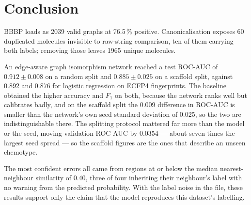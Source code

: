 \section{Conclusion}

BBBP loads as 2039 valid graphs at 76.5\,\% positive. Canonicalisation exposes 60 duplicated molecules invisible to raw-string comparison, ten of them carrying both labels; removing those leaves 1965 unique molecules.

An edge-aware graph isomorphism network reached a test ROC-AUC of $0.912 \pm 0.008$ on a random split and $0.885 \pm 0.025$ on a scaffold split, against 0.892 and 0.876 for logistic regression on ECFP4 fingerprints. The baseline obtained the higher accuracy and $F_1$ on both, because the network ranks well but calibrates badly, and on the scaffold split the 0.009 difference in ROC-AUC is smaller than the network's own seed standard deviation of 0.025, so the two are indistinguishable there. The splitting protocol mattered far more than the model or the seed, moving validation ROC-AUC by 0.0354 --- about seven times the largest seed spread --- so the scaffold figures are the ones that describe an unseen chemotype.

The most confident errors all came from regions at or below the median nearest-neighbour similarity of 0.40, three of four inheriting their neighbour's label with no warning from the predicted probability. With the label noise in the file, these results support only the claim that the model reproduces this dataset's labelling.

